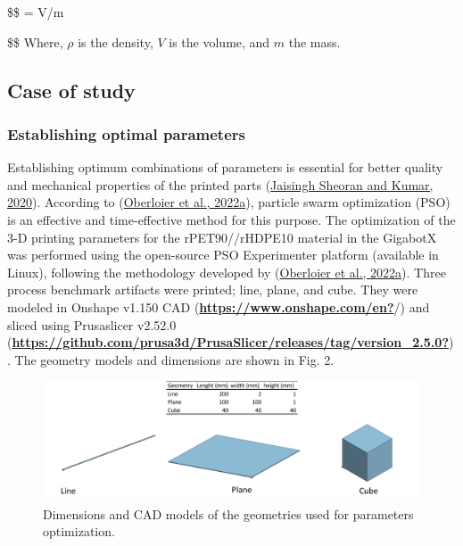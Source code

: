 \documentclass[
  12pt,
  number,
  review]{elsarticle}
\begin{document}
\$\$ \rho = V/m

\$\$ Where, \(\rho\) is the density, \(V\) is the volume, and \(m\) the
mass.

\hypertarget{case-of-study}{%
\subsection{Case of study}\label{case-of-study}}

\hypertarget{establishing-optimal-parameters}{%
\subsubsection{Establishing optimal
parameters}\label{establishing-optimal-parameters}}

Establishing optimum combinations of parameters is essential for better
quality and mechanical properties of the printed parts
(\protect\hyperlink{ref-jaisinghsheoran2020}{Jaisingh Sheoran and Kumar,
2020}). According to (\protect\hyperlink{ref-oberloier2022}{Oberloier et
al., 2022a}), particle swarm optimization (PSO) is an effective and
time-effective method for this purpose. The optimization of the 3-D
printing parameters for the rPET90//rHDPE10 material in the GigabotX was
performed using the open-source PSO Experimenter platform (available in
Linux), following the methodology developed by
(\protect\hyperlink{ref-oberloier2022}{Oberloier et al., 2022a}). Three
process benchmark artifacts were printed; line, plane, and cube. They
were modeled in Onshape v1.150 CAD
(\protect\hyperlink{ref-https:ux2fux2fwww.onshape.comux2fen}{\textbf{https://www.onshape.com/en?}}/)
and sliced using Prusaslicer v2.52.0
(\protect\hyperlink{ref-https:ux2fux2fgithub.comux2fprusa3dux2fPrusaSlicerux2freleasesux2ftagux2fversion_2.5.0}{\textbf{https://github.com/prusa3d/PrusaSlicer/releases/tag/version\_2.5.0?}}).
The geometry models and dimensions are shown in Fig. 2.

\begin{figure}

{\centering \includegraphics{figures/Figure-2.png}

}

\caption{Dimensions and CAD models of the geometries used for parameters
optimization.}

\end{figure}
\end{document}
